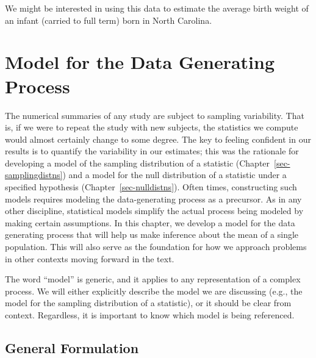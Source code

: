 \documentclass[
  letterpaper,
  DIV=11,
  numbers=noendperiod]{scrreprt}
\theoremstyle{definition}
\theoremstyle{definition}
\theoremstyle{plain}
\theoremstyle{remark}
\begin{document}
We might be interested in using this data to estimate the average birth
weight of an infant (carried to full term) born in North Carolina.

\chapter{Model for the Data Generating Process}\label{sec-meanmodels}

The numerical summaries of any study are subject to sampling
variability. That is, if we were to repeat the study with new subjects,
the statistics we compute would almost certainly change to some degree.
The key to feeling confident in our results is to quantify the
variability in our estimates; this was the rationale for developing a
model of the sampling distribution of a statistic
(Chapter~\ref{sec-samplingdistns}) and a model for the null distribution
of a statistic under a specified hypothesis
(Chapter~\ref{sec-nulldistns}). Often times, constructing such models
requires modeling the data-generating process as a precursor. As in any
other discipline, statistical models simplify the actual process being
modeled by making certain assumptions. In this chapter, we develop a
model for the data generating process that will help us make inference
about the mean of a single population. This will also serve as the
foundation for how we approach problems in other contexts moving forward
in the text.

\begin{tcolorbox}[enhanced jigsaw, colbacktitle=quarto-callout-note-color!10!white, colback=white, left=2mm, title=\textcolor{quarto-callout-note-color}{\faInfo}\hspace{0.5em}{Note}, toptitle=1mm, leftrule=.75mm, breakable, bottomrule=.15mm, arc=.35mm, rightrule=.15mm, toprule=.15mm, coltitle=black, opacityback=0, colframe=quarto-callout-note-color-frame, opacitybacktitle=0.6, bottomtitle=1mm, titlerule=0mm]

The word ``model'' is generic, and it applies to any representation of a
complex process. We will either explicitly describe the model we are
discussing (e.g., the model for the sampling distribution of a
statistic), or it should be clear from context. Regardless, it is
important to know which model is being referenced.

\end{tcolorbox}

\section{General Formulation}\label{general-formulation}
\end{document}
